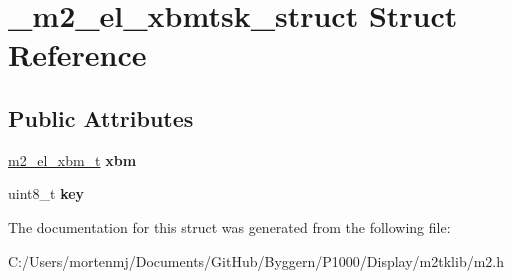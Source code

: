 \hypertarget{struct__m2__el__xbmtsk__struct}{\section{\-\_\-m2\-\_\-el\-\_\-xbmtsk\-\_\-struct Struct Reference}
\label{struct__m2__el__xbmtsk__struct}
}
\subsection*{Public Attributes}
\begin{DoxyCompactItemize}
\item 
\hypertarget{struct__m2__el__xbmtsk__struct_ad404fedb88561d5d0d00e523f8bc0765}{\hyperlink{struct__m2__el__xbm__struct}{m2\-\_\-el\-\_\-xbm\-\_\-t} {\bfseries xbm}}\label{struct__m2__el__xbmtsk__struct_ad404fedb88561d5d0d00e523f8bc0765}

\item 
\hypertarget{struct__m2__el__xbmtsk__struct_a79c4b304e5c3dc26fdf5f760889ce258}{uint8\-\_\-t {\bfseries key}}\label{struct__m2__el__xbmtsk__struct_a79c4b304e5c3dc26fdf5f760889ce258}

\end{DoxyCompactItemize}


The documentation for this struct was generated from the following file\-:\begin{DoxyCompactItemize}
\item 
C\-:/\-Users/mortenmj/\-Documents/\-Git\-Hub/\-Byggern/\-P1000/\-Display/m2tklib/m2.\-h\end{DoxyCompactItemize}
